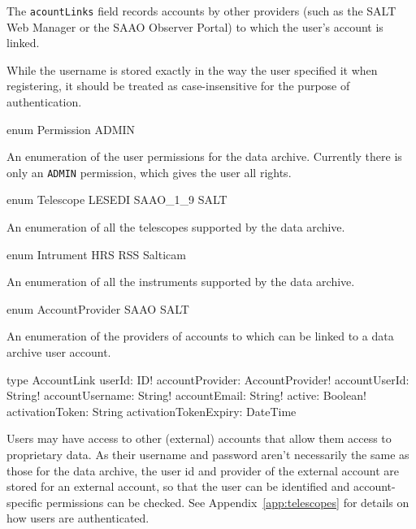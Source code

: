 The \verb|acountLinks| field records accounts by other providers (such as the SALT Web Manager or the SAAO Observer Portal) to which the user's account is linked.

\begin{note}
While the username is stored exactly in the way the user specified it when registering, it should be treated as case-insensitive for the purpose of authentication.
\end{note}


\begin{code}
enum Permission {
  ADMIN
}
\end{code}

An enumeration of the user permissions for the data archive. Currently there is only an \verb|ADMIN| permission, which gives the user all rights.


\begin{code}
enum Telescope {
  LESEDI
  SAAO_1_9
  SALT
}
\end{code}

An enumeration of all the telescopes supported by the data archive.


\begin{code}
enum Intrument {
  HRS
  RSS
  Salticam
}
\end{code}

An enumeration of all the instruments supported by the data archive.


\begin{code}
enum AccountProvider {
  SAAO
  SALT
}
\end{code}

An enumeration of the providers of accounts to which can be linked to a data archive user account.


\begin{code}
type AccountLink {
  userId: ID!
  accountProvider: AccountProvider!
  accountUserId: String!
  accountUsername: String!
  accountEmail: String!
  active: Boolean!
  activationToken: String
  activationTokenExpiry: DateTime
}
\end{code}

Users may have access to other (external) accounts that allow them access to proprietary data. As their username and password aren't necessarily the same as those for the data archive, the user id and provider of the external account are stored for an external account, so that the user can be identified and account-specific permissions can be checked. See Appendix~\ref{app:telescopes} for details on how users are authenticated.

